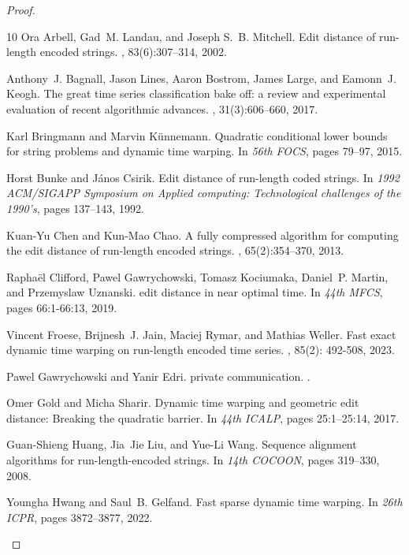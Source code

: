 \documentclass[a4paper,UKenglish,cleveref, autoref, thm-restate]{lipics-v2021}
\begin{document}
\begin{proof}
\begin{thebibliography}{10}
Ora Arbell, Gad~M. Landau, and Joseph S.~B. Mitchell.
\newblock Edit distance of run-length encoded strings.
, 83(6):307--314, 2002.

Anthony~J. Bagnall, Jason Lines, Aaron Bostrom, James Large, and Eamonn~J.
  Keogh.
\newblock The great time series classification bake off: a review and
  experimental evaluation of recent algorithmic advances.
, 31(3):606--660, 2017.

Karl Bringmann and Marvin K{\"u}nnemann.
\newblock Quadratic conditional lower bounds for string problems and dynamic
  time warping.
\newblock In {\em 56th {FOCS}}, pages 79--97, 2015.

Horst Bunke and J{\'a}nos Csirik.
\newblock Edit distance of run-length coded strings.
\newblock In {\em 1992 ACM/SIGAPP Symposium on Applied computing: Technological
  challenges of the 1990's}, pages 137--143, 1992.

Kuan-Yu Chen and Kun-Mao Chao.
\newblock A fully compressed algorithm for computing the edit distance of
  run-length encoded strings.
, 65(2):354--370, 2013.

Rapha{\"e}l Clifford, Pawel Gawrychowski, Tomasz Kociumaka, Daniel~P. Martin,
  and Przemyslaw Uznanski.
 edit distance in near optimal time.
\newblock In {\em 44th {MFCS}}, pages 66:1-66:13, 2019.

Vincent Froese, Brijnesh~J. Jain, Maciej Rymar, and Mathias Weller.
\newblock Fast exact dynamic time warping on run-length encoded time series.
, 85(2): 492-508, 2023.

Pawel Gawrychowski and Yanir Edri.
\newblock private communication.
.

Omer Gold and Micha Sharir.
\newblock Dynamic time warping and geometric edit distance: Breaking the
  quadratic barrier.
\newblock In {\em 44th {ICALP}}, pages 25:1--25:14, 2017.

Guan{-}Shieng Huang, Jia~Jie Liu, and Yue{-}Li Wang.
\newblock Sequence alignment algorithms for run-length-encoded strings.
\newblock In {\em 14th {COCOON}}, pages 319--330, 2008.

Youngha Hwang and Saul~B. Gelfand.
\newblock Fast sparse dynamic time warping.
\newblock In {\em 26th {ICPR}}, pages 3872--3877, 2022.


\end{thebibliography}
\end{proof}
\end{document}
